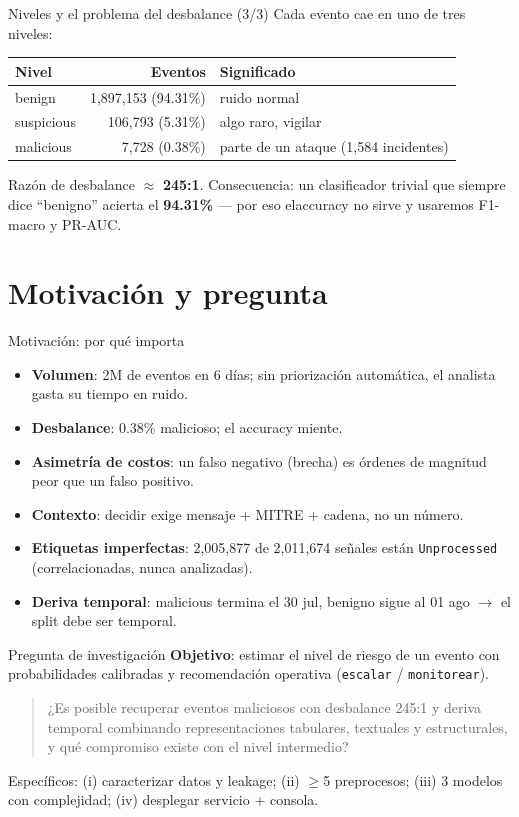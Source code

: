 \documentclass[aspectratio=169,10pt]{beamer}
\begin{document}
\begin{frame}{Niveles y el problema del desbalance (3/3)}
Cada evento cae en uno de tres niveles:

\begin{table}\small
\begin{tabular}{@{}lrl@{}}
\toprule
Nivel & Eventos & Significado \\
\midrule
benign & 1,897,153 (94.31\%) & ruido normal \\
suspicious & 106,793 (5.31\%) & algo raro, vigilar \\
malicious & 7,728 (0.38\%) & parte de un ataque (1,584 incidentes) \\
\bottomrule
\end{tabular}
\end{table}

Razón de desbalance $\approx$ \textbf{245:1}. Consecuencia: un clasificador trivial que siempre dice ``benigno'' acierta el \textbf{94.31\%} — por eso elaccuracy no sirve y usaremos F1-macro y PR-AUC.
\end{frame}

\section{Motivación y pregunta}
\begin{frame}{Motivación: por qué importa}
\begin{itemize}
\item \textbf{Volumen}: 2M de eventos en 6 días; sin priorización automática, el analista gasta su tiempo en ruido.
\item \textbf{Desbalance}: 0.38\% malicioso; el accuracy miente.
\item \textbf{Asimetría de costos}: un falso negativo (brecha) es \'ordenes de magnitud peor que un falso positivo.
\item \textbf{Contexto}: decidir exige mensaje + MITRE + cadena, no un n\'umero.
\item \textbf{Etiquetas imperfectas}: 2,005,877 de 2,011,674 se\~nales están \texttt{Unprocessed} (correlacionadas, nunca analizadas).
\item \textbf{Deriva temporal}: malicious termina el 30 jul, benigno sigue al 01 ago $\to$ el split debe ser temporal.
\end{itemize}
\end{frame}

\begin{frame}{Pregunta de investigación}
\textbf{Objetivo}: estimar el nivel de riesgo de un evento con probabilidades calibradas y recomendación operativa (\texttt{escalar} / \texttt{monitorear}).

\begin{quote}
¿Es posible recuperar eventos maliciosos con desbalance 245:1 y deriva temporal combinando representaciones tabulares, textuales y estructurales, y qué compromiso existe con el nivel intermedio?
\end{quote}

Específicos: (i) caracterizar datos y leakage; (ii) $\ge$5 preprocesos; (iii) 3 modelos con complejidad; (iv) desplegar servicio + consola.
\end{frame}
\end{document}
